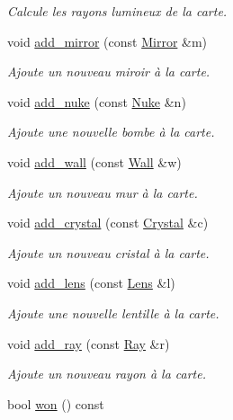 \begin{DoxyCompactItemize}
\begin{DoxyCompactList}\small\item\em Calcule les rayons lumineux de la carte. \end{DoxyCompactList}\item 
void \hyperlink{classLevel_ac3fe5b4a3cbf3853bbfbd5def8da181b}{add\+\_\+mirror} (const \hyperlink{classMirror}{Mirror} \&m)
\begin{DoxyCompactList}\small\item\em Ajoute un nouveau miroir à la carte. \end{DoxyCompactList}\item 
void \hyperlink{classLevel_a23e8bee1248893bbaeafc551d12982dc}{add\+\_\+nuke} (const \hyperlink{classNuke}{Nuke} \&n)
\begin{DoxyCompactList}\small\item\em Ajoute une nouvelle bombe à la carte. \end{DoxyCompactList}\item 
void \hyperlink{classLevel_a3de8f6b316f8b76aec53ac65ee52e418}{add\+\_\+wall} (const \hyperlink{classWall}{Wall} \&w)
\begin{DoxyCompactList}\small\item\em Ajoute un nouveau mur à la carte. \end{DoxyCompactList}\item 
void \hyperlink{classLevel_a2e9fbec678c73af65ee2500e70241239}{add\+\_\+crystal} (const \hyperlink{classCrystal}{Crystal} \&c)
\begin{DoxyCompactList}\small\item\em Ajoute un nouveau cristal à la carte. \end{DoxyCompactList}\item 
void \hyperlink{classLevel_ac8ace9b9f500c703e376c8f938cad6fe}{add\+\_\+lens} (const \hyperlink{classLens}{Lens} \&l)
\begin{DoxyCompactList}\small\item\em Ajoute une nouvelle lentille à la carte. \end{DoxyCompactList}\item 
void \hyperlink{classLevel_a596a53b1da4d70ce8e0f702e030861cc}{add\+\_\+ray} (const \hyperlink{classRay}{Ray} \&r)
\begin{DoxyCompactList}\small\item\em Ajoute un nouveau rayon à la carte. \end{DoxyCompactList}\item 
bool \hyperlink{classLevel_ad59e370eb6cd2612958208415f90b3ea}{won} () const 

\end{DoxyCompactItemize}
